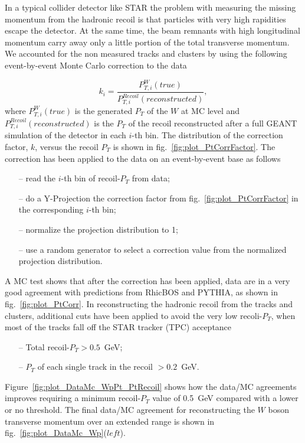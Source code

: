 \documentclass[12pt]{article}
\begin{document}
In a typical collider detector like STAR the problem with measuring the missing momentum from the hadronic recoil
is that particles with very high rapidities escape the detector. At the same time, the beam remnants with high
longitudinal momentum carry away only a little portion of the total transverse
momentum. We accounted for the non measured tracks and clusters by using the following event-by-event Monte Carlo 
correction to the data

\begin{equation}
k_{i}=\frac{P^{W}_{T,i}(true)}{P^{Recoil}_{T,i}(reconstructed)},
\end{equation}
where $P^{W}_{T,i}(true)$ is the generated $P_{T}$ of the $W$ at MC level and $P^{Recoil}_{T,i}(reconstructed)$ is the $P_{T}$ of the recoil reconstructed after a full GEANT simulation of the detector in each $i$-th bin. The distribution of the correction factor, $k$, versus the recoil $P_{T}$ is shown in fig.~\ref{fig:plot_PtCorrFactor}. The correction has been applied to the data on an event-by-event base as follows

\begin{itemize}
   \item[--] read the $i$-th bin of recoil-$P_{T}$ from data;
   \item[--] do a Y-Projection the correction factor from fig.~\ref{fig:plot_PtCorrFactor} in the corresponding $i$-th bin;
   \item[--] normalize the projection distribution to 1;
   \item[--] use a random generator to select a correction value from the normalized projection distribution.
\end{itemize}

A MC test shows that after the correction has been applied, data are in a very good agreement with predictions from RhicBOS and PYTHIA, as shown in fig.~\ref{fig:plot_PtCorr}. In reconstructing the hadronic recoil from the tracks and clusters, additional cuts have been applied to avoid the very low recoli-$P_{T}$, when most of the tracks fall off the STAR tracker (TPC) acceptance 
\begin{itemize}
   \item[--] Total recoil-$P_{T} > 0.5$~GeV; 
    \item[--] $P_{T}$ of each single track in the recoil $> 0.2$~GeV. 
\end{itemize}
Figure~\ref{fig:plot_DataMc_WpPt_PtRecoil} shows how the data/MC agreements improves requiring a minimum recoil-$P_{T}$ value of 0.5~GeV compared with a lower or no threshold.
The final data/MC agreement for reconstructing the $W$ boson transverse momentum over an extended range is  shown in fig.~\ref{fig:plot_DataMc_Wp}($left$).
\end{document}

